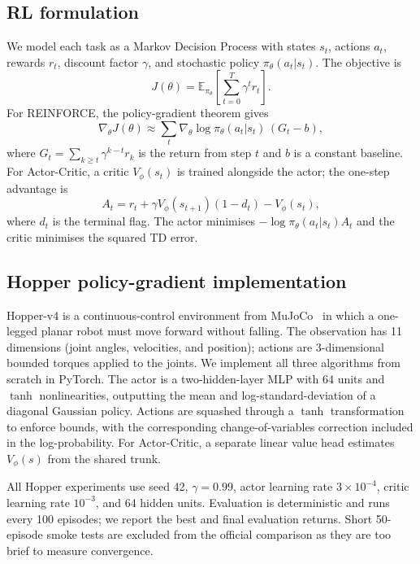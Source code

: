 \documentclass[10pt,twocolumn,letterpaper]{article}
\begin{document}
\subsection{RL formulation}

We model each task as a Markov Decision Process with states $s_t$, actions $a_t$, rewards $r_t$, discount factor $\gamma$, and stochastic policy $\pi_\theta(a_t|s_t)$. The objective is
\begin{equation}
J(\theta)=\mathbb{E}_{\pi_\theta}\!\left[\sum_{t=0}^{T}\gamma^t r_t\right].
\end{equation}
For REINFORCE, the policy-gradient theorem gives
\begin{equation}
\nabla_\theta J(\theta)\approx \sum_t \nabla_\theta \log \pi_\theta(a_t|s_t)\,(G_t-b),
\end{equation}
where $G_t=\sum_{k\ge t}\gamma^{k-t}r_k$ is the return from step $t$ and $b$ is a constant baseline. For Actor-Critic, a critic $V_\phi(s_t)$ is trained alongside the actor; the one-step advantage is
\begin{equation}
A_t=r_t+\gamma V_\phi(s_{t+1})(1-d_t)-V_\phi(s_t),
\end{equation}
where $d_t$ is the terminal flag. The actor minimises $-\log\pi_\theta(a_t|s_t)A_t$ and the critic minimises the squared TD error.

\subsection{Hopper policy-gradient implementation}

Hopper-v4 is a continuous-control environment from MuJoCo~\cite{todorov2012mujoco} in which a one-legged planar robot must move forward without falling. The observation has 11 dimensions (joint angles, velocities, and position); actions are 3-dimensional bounded torques applied to the joints. We implement all three algorithms from scratch in PyTorch. The actor is a two-hidden-layer MLP with 64 units and $\tanh$ nonlinearities, outputting the mean and log-standard-deviation of a diagonal Gaussian policy. Actions are squashed through a $\tanh$ transformation to enforce bounds, with the corresponding change-of-variables correction included in the log-probability. For Actor-Critic, a separate linear value head estimates $V_\phi(s)$ from the shared trunk.

All Hopper experiments use seed 42, $\gamma=0.99$, actor learning rate $3\!\times\!10^{-4}$, critic learning rate $10^{-3}$, and 64 hidden units. Evaluation is deterministic and runs every 100 episodes; we report the best and final evaluation returns. Short 50-episode smoke tests are excluded from the official comparison as they are too brief to measure convergence.
\end{document}
